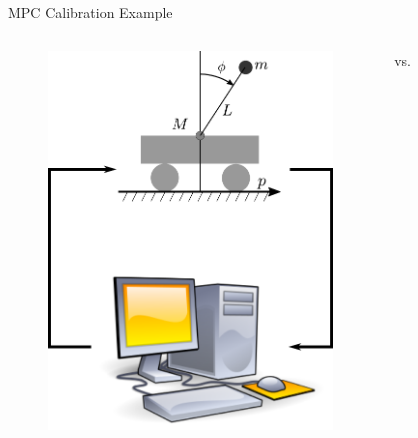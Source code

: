 \documentclass{beamer}
\begin{document}
\begin{frame}{MPC Calibration Example}%
\begin{columns}
\begin{figure}
	\centering
		\includegraphics[width=.99\textwidth]{img/example/HIL_PC.pdf}
\end{figure}
\centering
\huge vs.
\begin{figure}
	\centering

\end{figure}
\end{columns}
\end{frame}
\end{document}
